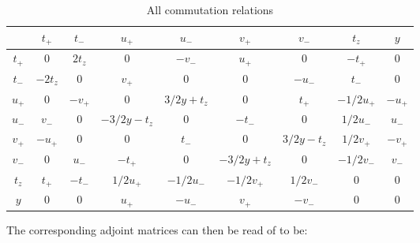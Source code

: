 \documentclass[a4paper,12pt]{article}
\begin{document}
\begin{table}[H]
	\centering
	\begin{tabular}{c||c|c|c|c|c|c|c|c}
		& $t_+$ & $t_-$ &	$u_+$ & $u_-$ & $v_+$ & $v_-$ & $t_z$ & $y$ \\
		\hline \hline
		 $t_+$ & 0 & $2t_z$ &  0  & $-v_-$ & $u_+$  & 0  & $-t_+$ & 0  \\
		\hline
		 $t_-$ & $-2t_z$ & $0$ &  $v_+$  & $0$ & $0$  & $-u_-$  & $t_-$ & 0  \\
		\hline
		 $u_+$ & $0$ & $-v_+$ &  $0$  & $3/2y+t_z$ & $0$  & $t_+$  & $-1/2 u_+$ & $-u_+$  \\
		\hline
		 $u_-$ & $v_-$ & $0$ &  $-3/2y-t_z$  & $0$ & $-t_-$  & $0$  & $1/2 u_-$ & $u_-$  \\
		\hline
		 $v_+$&  $-u_+$ & $0$ &  $0$  & $t_-$ & $0$  & $3/2y-t_z$  & $1/2 v_+$ & $-v_+$  \\
		\hline
		 $v_-$& $0$ & $u_-$ &  $-t_+$  & $0$ & $-3/2y+t_z$  & $0$  & $-1/2 v_-$ & $v_-$  \\
		\hline
		 $t_z$& $t_+$ & $-t_-$ &  $1/2u_+$  & $-1/2 u_-$ & $-1/2 v_+$  & $1/2v_-$  & $0$ & $0$  \\
		\hline
		 $y$ & $0$ & $0$ &  $u_+$  & $- u_-$ & $v_+$  & $-v_-$  & $0$ & $0$  \\
	\end{tabular}
	\caption{\label{tab:1} All commutation relations}
\end{table}
The corresponding adjoint matrices can then be read of to be:
\end{document}
